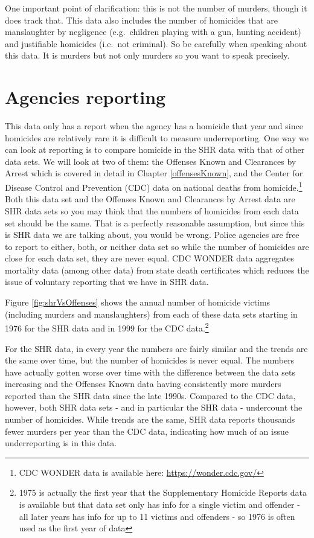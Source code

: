 \documentclass[
]{krantz}
\begin{document}
One important point of clarification: this is not the number
of murders, though it does track that. This data also
includes the number of homicides that are manslaughter by
negligence (e.g.~children playing with a gun, hunting
accident) and justifiable homicides (i.e.~not criminal). So
be carefully when speaking about this data. It is murders
but not only murders so you want to speak precisely.

\section{Agencies reporting}\label{agencies-reporting-2}

This data only has a report when the agency has a homicide
that year and since homicides are relatively rare it is
difficult to measure underreporting. One way we can look at
reporting is to compare homicide in the SHR data with that
of other data sets. We will look at two of them: the Offenses
Known and Clearances by Arrest which is covered in detail in
Chapter \ref{offensesKnown}, and the Center for Disease
Control and Prevention (CDC) data on national deaths from
homicide.\footnote{CDC WONDER data is available here:
  \url{https://wonder.cdc.gov/}} Both this data set and the
Offenses Known and Clearances by Arrest data are SHR
data sets so you may think that the numbers of homicides from
each data set should be the same. That is a perfectly
reasonable assumption, but since this is SHR data we are
talking about, you would be wrong. Police agencies are free
to report to either, both, or neither data set so while the
number of homicides are close for each data set, they are
never equal. CDC WONDER data aggregates mortality data
(among other data) from state death certificates which
reduces the issue of voluntary reporting that we have in SHR
data.

Figure \ref{fig:shrVsOffenses} shows the annual number of
homicide victims (including murders and manslaughters) from
each of these data sets starting in 1976 for the SHR data and
in 1999 for the CDC data.\footnote{1975 is actually the
  first year that the Supplementary Homicide Reports data is
  available but that data set only has info for a single
  victim and offender - all later years has info for up to
  11 victims and offenders - so 1976 is often used as the
  first year of data}

For the SHR data, in every year the numbers are fairly
similar and the trends are the same over time, but the
number of homicides is never equal. The numbers have
actually gotten worse over time with the difference between
the data sets increasing and the Offenses Known data having
consistently more murders reported than the SHR data since
the late 1990s. Compared to the CDC data, however, both SHR
data sets - and in particular the SHR data - undercount the
number of homicides. While trends are the same, SHR data
reports thousands fewer murders per year than the CDC data,
indicating how much of an issue underreporting is in this
data.
\end{document}
